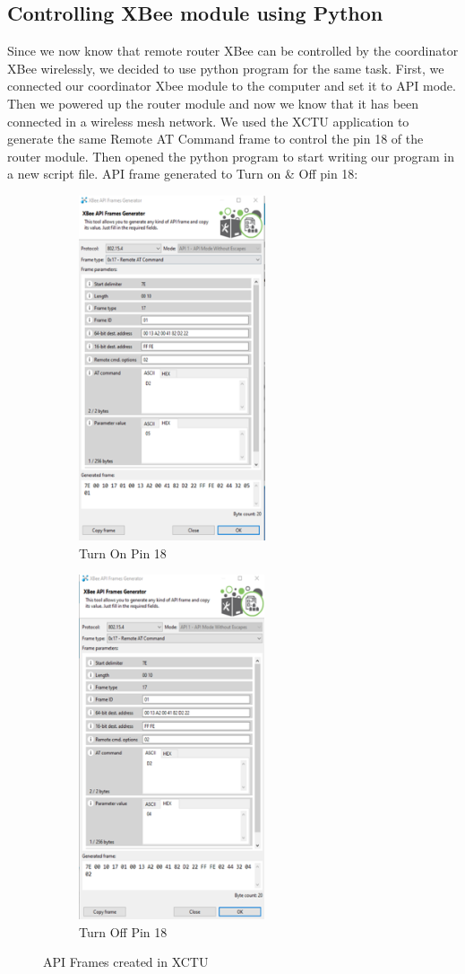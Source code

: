 \documentclass[a4paper,11pt]{report}
\begin{document}
	\subsection{Controlling XBee module using Python}
	\par Since we now know that remote router XBee can be controlled by the coordinator XBee wirelessly, we decided to use python program for the same task. First, we connected our coordinator Xbee module to the computer and set it to API mode. Then we powered up the router module and now we know that it has been connected in a wireless mesh network. We used the XCTU application to generate the same Remote AT Command frame to control the pin 18 of the router module. Then opened the python program to start writing our program in a new script file. API frame generated to Turn on \& Off pin 18: 
	\begin{figure}[h!]
		\centering
		\begin{subfigure}[t]{0.45\textwidth}
			\centering
			\includegraphics[height=4in]{xctuFrames1.png}
			\caption{Turn On Pin 18}
		\end{subfigure}
		\begin{subfigure}[t]{0.45\textwidth}
			\centering
			\includegraphics[height=4in]{xctuFrames2.png}
			\caption{Turn Off Pin 18}
		\end{subfigure}
		\caption{API Frames created in XCTU}
	\end{figure} 
\end{document}
